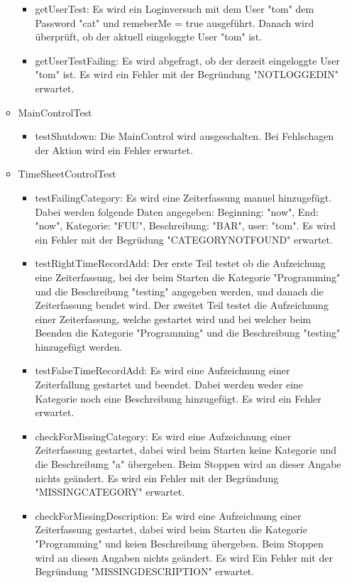 \begin{itemize}
\begin{itemize}
\begin{itemize}
            \item getUserTest: Es wird ein Loginversuch mit dem User "tom" dem Password "cat" und remeberMe = true ausgeführt. Danach wird überprüft, ob der aktuell eingeloggte User "tom" ist.
            \item getUserTestFailing: Es wird abgefragt, ob der derzeit eingeloggte User "tom" ist. Es wird ein Fehler mit der Begründung "NOTLOGGEDIN" erwartet.
          \end{itemize}
          \item MainControlTest
            \begin{itemize}
              \item testShutdown: Die MainControl wird ausgeschalten. Bei Fehlschagen der Aktion wird ein Fehler erwartet.
            \end{itemize}
          \item TimeSheetControlTest
            \begin{itemize} 
              \item testFailingCategory: Es wird eine Zeiterfassung manuel hinzugefügt. Dabei werden folgende Daten angegeben: Beginning: "now", End: "now", Kategorie: "FUU", Beschreibung: "BAR", user: "tom". Es wird ein Fehler mit der Begrüdung "CATEGORYNOTFOUND" erwartet.
              \item testRightTimeRecordAdd: Der erste Teil testet ob die Aufzeichung eine Zeiterfassung, bei der beim Starten die Kategorie "Programming" und die Beschreibung "testing" angegeben werden, und danach die Zeiterfassung bendet wird. Der zweitet Teil testet die Aufzeichnung einer Zeiterfassung, welche gestartet wird und bei welcher beim Beenden die Kategorie "Programming" und die Beschreibung "testing" hinzugefügt werden.
              \item testFalseTimeRecordAdd: Es wird eine Aufzeichnung einer Zeiterfallung gestartet und beendet. Dabei werden weder eine Kategorie noch eine Beschreibung hinzugefügt. Es wird ein Fehler erwartet.
              \item checkForMissingCategory: Es wird eine Aufzeichnung einer Zeiterfassung gestartet, dabei wird beim Starten keine Kategorie und die Beschreibung "a" übergeben. Beim Stoppen wird an dieser Angabe nichts geändert. Es wird ein Fehler mit der Begründung "MISSINGCATEGORY" erwartet.
              \item checkForMissingDescription: Es wird eine Aufzeichnung einer Zeiterfassung gestartet, dabei wird beim Starten die Kategorie "Programming" und keien Beschreibung übergeben. Beim Stoppen wird an diesen Angaben nichts geändert. Es wird Ein Fehler mit der Begründung "MISSINGDESCRIPTION" erwartet.

\end{itemize}
\end{itemize}
\end{itemize}
